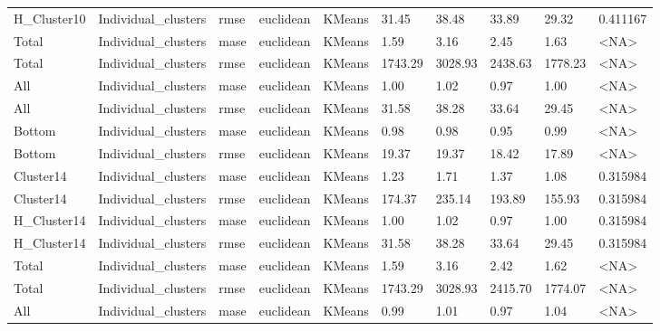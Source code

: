 \begin{tabular}{llllllllll}
H\_Cluster10 & Individual\_clusters &   rmse &  euclidean &        KMeans &   31.45 &    38.48 &                 33.89 &         29.32 &  0.411167 \\
      Total & Individual\_clusters &   mase &  euclidean &        KMeans &    1.59 &     3.16 &                  2.45 &          1.63 &      <NA> \\
      Total & Individual\_clusters &   rmse &  euclidean &        KMeans & 1743.29 &  3028.93 &               2438.63 &       1778.23 &      <NA> \\
        All & Individual\_clusters &   mase &  euclidean &        KMeans &    1.00 &     1.02 &                  0.97 &          1.00 &      <NA> \\
        All & Individual\_clusters &   rmse &  euclidean &        KMeans &   31.58 &    38.28 &                 33.64 &         29.45 &      <NA> \\
     Bottom & Individual\_clusters &   mase &  euclidean &        KMeans &    0.98 &     0.98 &                  0.95 &          0.99 &      <NA> \\
     Bottom & Individual\_clusters &   rmse &  euclidean &        KMeans &   19.37 &    19.37 &                 18.42 &         17.89 &      <NA> \\
  Cluster14 & Individual\_clusters &   mase &  euclidean &        KMeans &    1.23 &     1.71 &                  1.37 &          1.08 &  0.315984 \\
  Cluster14 & Individual\_clusters &   rmse &  euclidean &        KMeans &  174.37 &   235.14 &                193.89 &        155.93 &  0.315984 \\
H\_Cluster14 & Individual\_clusters &   mase &  euclidean &        KMeans &    1.00 &     1.02 &                  0.97 &          1.00 &  0.315984 \\
H\_Cluster14 & Individual\_clusters &   rmse &  euclidean &        KMeans &   31.58 &    38.28 &                 33.64 &         29.45 &  0.315984 \\
      Total & Individual\_clusters &   mase &  euclidean &        KMeans &    1.59 &     3.16 &                  2.42 &          1.62 &      <NA> \\
      Total & Individual\_clusters &   rmse &  euclidean &        KMeans & 1743.29 &  3028.93 &               2415.70 &       1774.07 &      <NA> \\
        All & Individual\_clusters &   mase &  euclidean &        KMeans &    0.99 &     1.01 &                  0.97 &          1.04 &      <NA> \\

\end{tabular}
